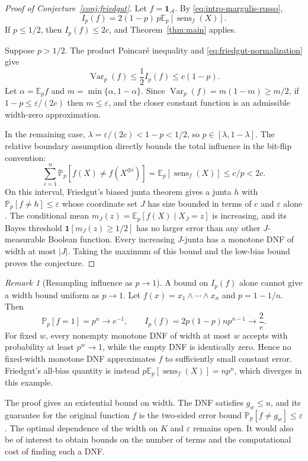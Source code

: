 \documentclass[11pt,letterpaper]{article}
\theoremstyle{definition}
\theoremstyle{remark}
\newtheorem{remark}[theorem]{Remark}
\newcommand{\E}{\mathbb E}
\renewcommand{\Pr}{\mathbb P}
\newcommand{\Var}{\operatorname{Var}}
\newcommand{\one}{\mathbf 1}
\newcommand{\sens}{\operatorname{sens}}
\newcommand{\cA}{\mathcal A}
\begin{document}
\begin{proof}[Proof of Conjecture~\ref{conj:friedgut}]
Let $f=\one_{\cA}$.  By \eqref{eq:intro-margulis-russo},
\begin{equation}
\label{eq:friedgut-normalization}
       I_p(f)=2(1-p)\,p\E_p[\sens_f(X)].
\end{equation}
If $p\le1/2$, then $I_p(f)\le2c$, and
Theorem~\ref{thm:main} applies.

Suppose $p>1/2$.  The product Poincar\'e inequality and
\eqref{eq:friedgut-normalization} give
\[
       \Var_p(f)\le\frac12 I_p(f)
       \le c(1-p).
\]
Let $\alpha=\E_p f$ and $m=\min\{\alpha,1-\alpha\}$.  Since
$\Var_p(f)=m(1-m)\ge m/2$, if
$1-p\le\varepsilon/(2c)$ then $m\le\varepsilon$, and the closer constant
function is an admissible width-zero approximation.

In the remaining case, $\lambda=\varepsilon/(2c)<1-p<1/2$, so
$p\in[\lambda,1-\lambda]$.  The relative boundary assumption directly
bounds the total influence in the bit-flip convention:
\[
  \sum_{i=1}^n\Pr_p[f(X)\ne f(X^{\oplus i})]
  =\E_p[\sens_f(X)]\le c/p<2c.
\]
On this interval, Friedgut's biased junta theorem gives a junta $h$ with
$\Pr_p[f\ne h]\le\varepsilon$ whose coordinate set $J$ has size bounded
in terms of $c$ and $\varepsilon$ alone \cite{Friedgut1998,ODonnell2014}.
The conditional mean $m_J(z)=\E_p[f(X)\mid X_J=z]$ is increasing, and
its Bayes threshold
$\one[m_J(z)\ge1/2]$ has no larger error than any other $J$-measurable Boolean
function.  Every increasing $J$-junta has a monotone DNF of width at most
$|J|$.  Taking the maximum of this bound and the low-bias bound proves the
conjecture.
\end{proof}

\begin{remark}[Resampling influence as $p\to1$]
\label{rem:high-bias-and}
A bound on $I_p(f)$ alone cannot give a width bound uniform as $p\to1$.  Let
$f(x)=x_1\wedge\cdots\wedge x_n$ and $p=1-1/n$.  Then
\[
       \Pr_p[f=1]=p^n\longrightarrow e^{-1},
       \qquad
       I_p(f)=2p(1-p)np^{n-1}\longrightarrow\frac2e.
\]
For fixed $w$, every nonempty monotone DNF of width at most $w$ accepts with
probability at least $p^w\to1$, while the empty DNF is identically zero.
Hence no fixed-width monotone DNF approximates $f$ to sufficiently small
constant error.  Friedgut's all-bias quantity is instead
$p\E_p[\sens_f(X)]=np^n$, which diverges in this example.
\end{remark}


The proof gives an existential bound on width.  The DNF satisfies $g_w\le u$,
and its guarantee for the original function $f$ is the two-sided error bound
$\Pr_p[f\ne g_w]\le\varepsilon$.  The optimal dependence of the width on $K$
and $\varepsilon$ remains open.  It would also be of interest to obtain
bounds on the number of terms and the computational cost of finding such a DNF.
\end{document}
